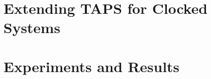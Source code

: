 \documentclass[a4paper]{report}
\begin{document}
\newpage
\tableofcontents

\newpage
{}


% 
%
% 
%
% 
%
% 
%
% 
%
% 
%
% 
%
\chapter{Extending TAPS for Clocked Systems}
\label{chap:clock}

%
\chapter{Experiments and Results}
\label{chap:exp}

%
% 
%
% 
%
% 
\end{document}
